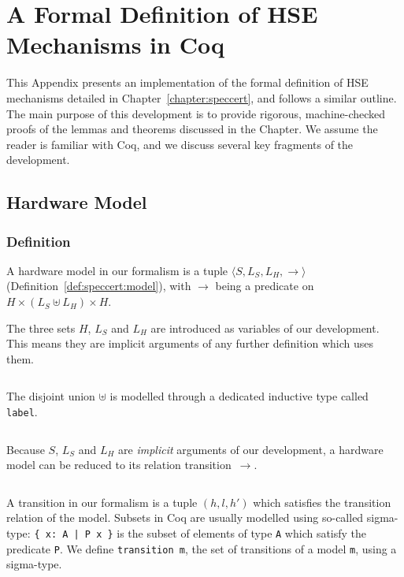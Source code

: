 \chapter{A Formal Definition of HSE Mechanisms in Coq}
\label{appendix:speccert}

This Appendix presents an implementation of the formal definition of HSE
mechanisms detailed in Chapter~\ref{chapter:speccert}, and follows a similar
outline.
%
The main purpose of this development is to provide rigorous, machine-checked
proofs of the lemmas and theorems discussed in the Chapter.
%
We assume the reader is familiar with Coq, and we discuss several key fragments
of the development.

\section{Hardware Model}

\subsection{Definition}

A hardware model in our formalism is a tuple
$\langle S, L_S, L_H, \rightarrow \rangle$
(Definition~\ref{def:speccert:model}), with $\rightarrow$ being a predicate on
$H \times (L_S \uplus L_H) \times H$.

The three sets $H$, $L_S$ and $L_H$ are introduced as variables of our
development.
%
This means they are implicit arguments of any further definition which uses
them.

\inputminted[gobble=2,firstline=2,lastline=2]{coq}{Listings/SpecCert.v}

The disjoint union $\uplus$ is modelled through a dedicated inductive type
called \texttt{label}.

\inputminted[gobble=2,firstline=4,lastline=8]{coq}{Listings/SpecCert.v}

Because $S$, $L_S$ and $L_H$ are \emph{implicit} arguments of our development, a
hardware model can be reduced to its relation transition~$\rightarrow$.

\inputminted[gobble=2,firstline=10,lastline=12]{coq}{Listings/SpecCert.v}

A transition in our formalism is a tuple $(h, l, h')$ which satisfies the
transition relation of the model.
%
Subsets in Coq are usually modelled using so-called sigma-type:
%
\texttt{\{ x: A | P x \}} is the subset of elements of type \texttt{A} which
satisfy the predicate \texttt{P}.
%
We define \texttt{transition m}, the set of transitions of a model \texttt{m},
using a sigma-type.


